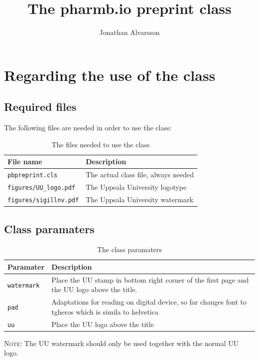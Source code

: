 \documentclass[watermark]{pbpreprint}
\begin{document}
\title{The pharm\textcolor{uured}{b.io} preprint class}
\author{Jonathan Alvarsson}
\maketitle
\begin{KeepFromToc}
   \tableofcontents
\end{KeepFromToc}
\section{Regarding the use of the class}
\subsection{Required files}
The following files are needed in order to use the class:

\begin{table}[H]
    \centering
    \caption{The files needed to use the class}
    \begin{tabular}{ll}
    \toprule
    File name & Description \\
    \midrule
    \texttt{pbpreprint.cls} & The actual class file, always needed \\
    \texttt{figures/UU\_logo.pdf} & The Uppsala University logotype \\
    \texttt{figures/sigillnv.pdf} & The Uppsala University watermark \\
    \bottomrule
    \end{tabular}
\end{table}


\subsection{Class paramaters}
\begin{table}[H]
\caption{The class paramaters}
\centering
\begin{tabular}{lp{}}
    \toprule
    Paramater & Description \\
    \midrule
    \texttt{watermark} & Place the UU stamp in bottom right corner of the first
                         page and the UU logo above the title. \\ 
    \texttt{pad} & Adaptations for reading on digital device, so far changes font to tgheros which is simila to helvetica \\
    \texttt{uu}        & Place the UU logo above the title \\
    \bottomrule
\end{tabular}
    \flushleft
    {\footnotesize \textsc{Note}: The UU watermark should only be used
                         together with the normal UU logo.}
\end{table}
\end{document}
